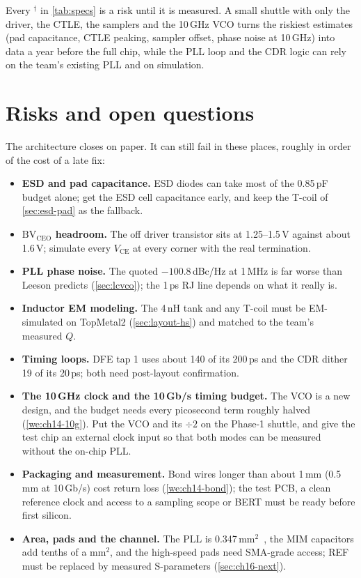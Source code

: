 \begin{insight}
Every $^\dagger$ in \cref{tab:specs} is a risk until it is measured. A small shuttle with only the driver, the CTLE, the samplers and the 10\,GHz VCO turns the riskiest estimates (pad capacitance, CTLE peaking, sampler offset, phase noise at 10\,GHz) into data a year before the full chip, while the PLL loop and the CDR logic can rely on the team's existing PLL and on simulation.
\end{insight}

\section{Risks and open questions}\label{sec:ch14-risks}

The architecture closes on paper. It can still fail in these places, roughly in order of the cost of a late fix:
\begin{itemize}
  \item \textbf{ESD and pad capacitance.} ESD diodes can take most of the 0.85\,pF budget alone; get the \sgx{} ESD cell capacitance early, and keep the T-coil of \cref{sec:esd-pad} as the fallback.
  \item \textbf{$\mathrm{BV}_\mathrm{CEO}$ headroom.} The off driver transistor sits at 1.25--1.5\,V against about 1.6\,V; simulate every $V_\mathrm{CE}$ at every corner with the real termination.
  \item \textbf{PLL phase noise.} The quoted $-100.8$\,dBc/Hz at 1\,MHz is far worse than Leeson predicts (\cref{sec:lcvco}); the 1\,ps RJ line depends on what it really is.
  \item \textbf{Inductor EM modeling.} The 4\,nH tank and any T-coil must be EM-simulated on TopMetal2 (\cref{sec:layout-hs}) and matched to the team's measured $Q$.
  \item \textbf{Timing loops.} DFE tap 1 uses about 140 of its 200\,ps and the CDR dither 19 of its 20\,ps; both need post-layout confirmation.
  \item \textbf{The 10\,GHz clock and the 10\,Gb/s timing budget.} The VCO is a new design, and the budget needs every picosecond term roughly halved (\cref{we:ch14-10g}). Put the VCO and its $\div2$ on the Phase-1 shuttle, and give the test chip an external clock input so that both modes can be measured without the on-chip PLL.
  \item \textbf{Packaging and measurement.} Bond wires longer than about 1\,mm (0.5\,mm at 10\,Gb/s) cost return loss (\cref{we:ch14-bond}); the test PCB, a clean reference clock and access to a sampling scope or BERT must be ready before first silicon.
  \item \textbf{Area, pads and the channel.} The PLL is 0.347\,mm$^2$~\cite{smacd2026pll}, the MIM capacitors add tenths of a mm$^2$, and the high-speed pads need SMA-grade access; REF must be replaced by measured S-parameters (\cref{sec:ch16-next}).
\end{itemize}

